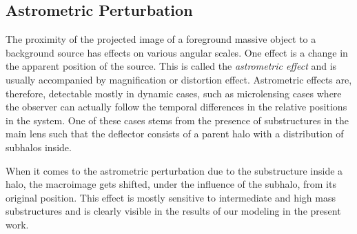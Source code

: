 \documentclass[a4wide,12pt]{book}
\begin{document}
{%

\subsection{Astrometric Perturbation}
The proximity of the projected image of a foreground massive object to a background source has effects on various angular scales. One effect is a change in the apparent position of the source. This is called the \emph{astrometric effect} and is usually accompanied by magnification or distortion effect. Astrometric effects are, therefore, detectable mostly in dynamic cases, such as microlensing cases where the observer can actually follow the temporal differences in the relative positions in the system. One of these cases stems from the presence of substructures in the main lens such that the deflector consists of a parent halo with a distribution of subhalos inside. 
 
When it comes to the astrometric perturbation due to the substructure inside a halo, the macroimage gets shifted, under the influence of the subhalo, from its original position. This effect is mostly sensitive to intermediate and high mass substructures \citet{Moustakas+2009} and is clearly visible in the results of our modeling in the present work. %

 
}
\end{document}

